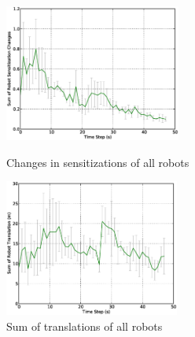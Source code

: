 \documentclass{llncs}
\begin{document}
\begin{figure}
\begin{minipage}[t]{0.5\linewidth}
\centering
\includegraphics[height=4.5cm, angle=0]
{images/global/RobotSensitizationStat-Total-50steps.eps}
\caption{\small Changes in sensitizations of all robots}
\label{fig:sensitization-stat} %
\end{minipage}
\hspace{0.5cm}
\begin{minipage}[t]{0.5\linewidth}
\centering
\includegraphics[height=4.5cm, angle=0]{images/global/DeltaTranslationStat.eps}
\caption{\small Sum of translations of all robots }
\label{fig:translation-stat} %
\end{minipage}
\end{figure}
\end{document}
